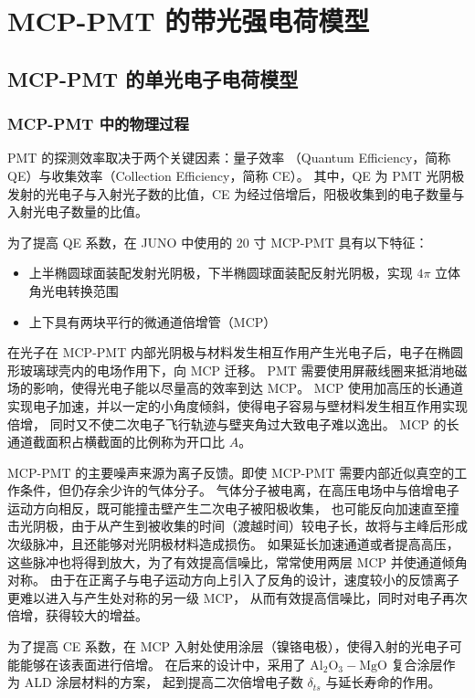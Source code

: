 
\chapter{MCP-PMT 的带光强电荷模型}

\section{MCP-PMT 的单光电子电荷模型}
\subsection{MCP-PMT 中的物理过程}\label{sec:mcp-pmt-process}
PMT 的探测效率取决于两个关键因素：量子效率 （Quantum Efficiency，简称 QE）与收集效率（Collection Efficiency，简称 CE）。
其中，QE 为 PMT 光阴极发射的光电子与入射光子数的比值，CE 为经过倍增后，阳极收集到的电子数量与入射光电子数量的比值。

为了提高 QE 系数，在 JUNO 中使用的 20 寸 MCP-PMT 具有以下特征\cite{wangNewDesignLarge2012}：
\begin{itemize}
    \item 上半椭圆球面装配发射光阴极，下半椭圆球面装配反射光阴极，实现 $4\pi$ 立体角光电转换范围
    \item 上下具有两块平行的微通道倍增管（MCP）
\end{itemize}

在光子在 MCP-PMT 内部光阴极与材料发生相互作用产生光电子后，电子在椭圆形玻璃球壳内的电场作用下，向 MCP 迁移。
PMT 需要使用屏蔽线圈来抵消地磁场的影响，使得光电子能以尽量高的效率到达 MCP。
MCP 使用加高压的长通道实现电子加速，并以一定的小角度倾斜，使得电子容易与壁材料发生相互作用实现倍增，
同时又不使二次电子飞行轨迹与壁夹角过大致电子难以逸出。
MCP 的长通道截面积占横截面的比例称为开口比 $A$。

MCP-PMT 的主要噪声来源为离子反馈。即使 MCP-PMT 需要内部近似真空的工作条件，但仍存余少许的气体分子。
气体分子被电离，在高压电场中与倍增电子运动方向相反，既可能撞击壁产生二次电子被阳极收集，
也可能反向加速直至撞击光阴极，由于从产生到被收集的时间（渡越时间）较电子长，故将与主峰后形成次级脉冲，且还能够对光阴极材料造成损伤。
如果延长加速通道或者提高高压，这些脉冲也将得到放大，为了有效提高信噪比，常常使用两层 MCP 并使通道倾角对称。
由于在正离子与电子运动方向上引入了反角的设计，速度较小的反馈离子更难以进入与产生处对称的另一级 MCP，
从而有效提高信噪比，同时对电子再次倍增，获得较大的增益\cite{MaterialStore2010}。

为了提高 CE 系数，在 MCP 入射处使用涂层（镍铬电极），使得入射的光电子可能能够在该表面进行倍增。
在后来的设计中，采用了 $\text{Al}_2\text{O}_3-\text{MgO}$ 复合涂层作为 ALD 涂层材料的方案，
起到提高二次倍增电子数 $\delta_{ts}$ 与延长寿命的作用。

